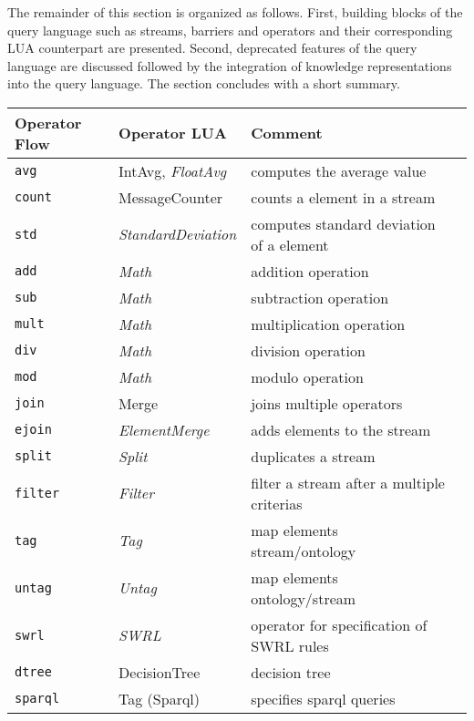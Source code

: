 The remainder of this section is organized as follows. First, building blocks of 
the query language such as streams, barriers and operators and their 
corresponding LUA counterpart are presented. Second, deprecated features of the 
query language are discussed followed by the integration of knowledge 
representations into the query language. The section concludes with a short
summary.
\begin{center}
  \begin{tabular}{|l|l|l|l|}
  \hline 
  \textbf{Operator Flow} &  \textbf{Operator LUA} &  \textbf{Comment} \\
  \hline 
  \hline 
  \texttt{avg} & IntAvg, \textit{FloatAvg} & computes the average value \\
  \hline 
  \texttt{count} & MessageCounter & counts a element in a stream \\
  \hline 
  \texttt{std} & \textit{StandardDeviation} & computes standard deviation of a element \\
  \hline 
  \texttt{add} & \textit{Math} & addition operation \\
  \hline 
  \texttt{sub} & \textit{Math} & subtraction operation \\
  \hline 
  \texttt{mult} & \textit{Math} & multiplication operation \\
  \hline 
  \texttt{div} & \textit{Math} & division operation \\
  \hline 
  \texttt{mod} & \textit{Math} & modulo operation \\
  \hline 
  \texttt{join} & Merge & joins multiple operators \\
  \hline 
  \texttt{ejoin} & \textit{ElementMerge} & adds elements to the stream \\
  \hline
  \texttt{split} & \textit{Split} & duplicates a stream \\
  \hline
  \texttt{filter} & \textit{Filter} & filter a stream after a multiple criterias \\
  \hline
  \texttt{tag} & \textit{Tag} & map elements stream/ontology \\
  \hline   
  \texttt{untag} & \textit{Untag} & map elements ontology/stream \\
  \hline 
  \texttt{swrl} &  \textit{SWRL} & operator for specification of SWRL rules \\
  \hline
  \texttt{dtree} & DecisionTree & decision tree \\
  \hline  
  \texttt{sparql} & Tag (Sparql) & specifies sparql queries \\

\end{tabular}
\end{center}
